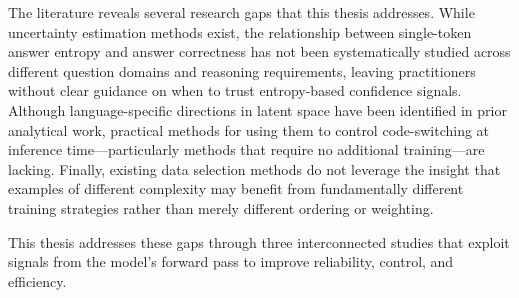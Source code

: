 The literature reveals several research gaps that this thesis addresses. While uncertainty estimation methods exist, the relationship between single-token answer entropy and answer correctness has not been systematically studied across different question domains and reasoning requirements, leaving practitioners without clear guidance on when to trust entropy-based confidence signals. Although language-specific directions in latent space have been identified in prior analytical work, practical methods for using them to control code-switching at inference time---particularly methods that require no additional training---are lacking. Finally, existing data selection methods do not leverage the insight that examples of different complexity may benefit from fundamentally different training strategies rather than merely different ordering or weighting.

This thesis addresses these gaps through three interconnected studies that exploit signals from the model's forward pass to improve reliability, control, and efficiency.
